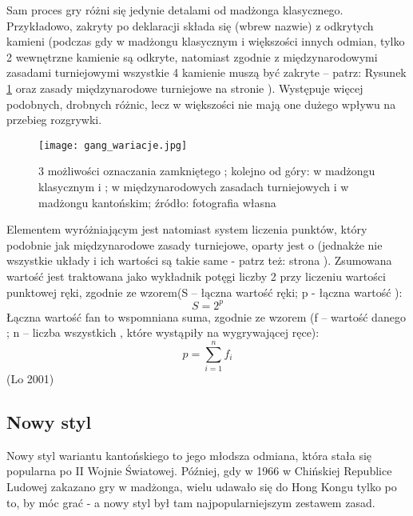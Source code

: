 Sam proces gry różni się jedynie detalami od madżonga klasycznego.
Przykładowo, zakryty  po deklaracji składa się (wbrew nazwie) z
odkrytych kamieni (podczas gdy w madżongu klasycznym i większości innych
odmian, tylko 2 wewnętrzne kamienie są odkryte, natomiast zgodnie z
międzynarodowymi zasadami turniejowymi wszystkie 4 kamienie muszą być zakryte
-- patrz: Rysunek \ref{fig:closed_gang_options} oraz zasady międzynarodowe
turniejowe na stronie \pageref{closed_gang}).
Występuje więcej podobnych, drobnych różnic, lecz w większości nie mają one dużego wpływu na przebieg
rozgrywki.

\begin{figure}[H]
  \centering
  \texttt{[image: gang\_wariacje.jpg]}
  \caption{3 możliwości oznaczania zamkniętego ; kolejno od góry:
  w madżongu klasycznym i ; w międzynarodowych zasadach
  turniejowych i w madżongu kantońskim; źródło: fotografia własna}
  \label{fig:closed_gang_options}
\end{figure}

Elementem wyróżniającym jest natomiast system liczenia punktów, który podobnie
jak międzynarodowe zasady turniejowe, oparty jest o  (jednakże
nie wszystkie układy i ich wartości są takie same - patrz też: strona
\pageref{fan}). Zsumowana wartość  jest traktowana jako wykładnik
potęgi liczby 2 przy liczeniu wartości punktowej ręki, zgodnie ze wzorem(S --
łączna wartość ręki; p - łączna wartość ):
	\begin{equation*}
		S = 2^{p}
		\label{hkos_scoring:point_score}
	\end{equation*}
Łączna wartość fan to wspomniana suma, zgodnie ze wzorem (f -- wartość danego
; n -- liczba wszystkich , które wystąpiły na
wygrywającej ręce):
	\begin{equation*}
		p = \sum\limits_{i=1}^n f_{i}
		\label{hkos_scoring:fan_score}
	\end{equation*}
(Lo 2001)

\subsection{Nowy styl}
Nowy styl wariantu kantońskiego to jego młodsza odmiana, która stała się
popularna po II Wojnie Światowej. Później, gdy w 1966 w Chińskiej Republice
Ludowej zakazano gry w madżonga, wielu udawało się do Hong Kongu tylko po to, by
móc grać - a nowy styl był tam najpopularniejszym zestawem zasad.

